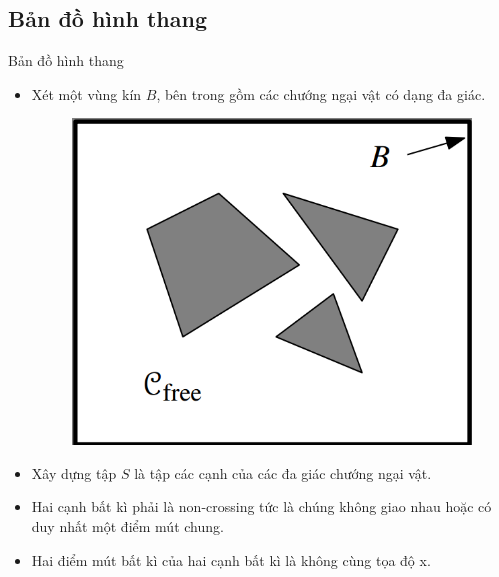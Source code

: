 \documentclass[compress]{beamer}
\begin{document}
\subsection{Bản đồ hình thang}
\begin{frame}{Bản đồ hình thang}
\begin{itemize}
\item Xét một vùng kín $B$, bên trong gồm các chướng ngại vật có dạng đa giác. 
\begin{figure}[H]
\centering
\includegraphics[scale=0.2]{normal.png}
\end{figure}
\item Xây dựng tập $S$ là tập các cạnh của các đa giác chướng ngại vật.
\item Hai cạnh bất kì phải là non-crossing tức là chúng không giao nhau hoặc có duy nhất một điểm mút chung.
\item Hai điểm mút bất kì của hai cạnh bất kì là không cùng tọa độ x.
\end{itemize}
\end{frame}
\end{document}
